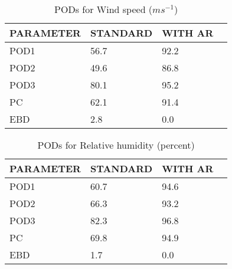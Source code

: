 \documentclass[11pt,english]{article}
\begin{document}
\newpage

\clearpage
\begin{table}[]
\begin{center}
\begin{tabular}{|l|l|l|l|}
\hline
\multicolumn{1}{|c|}{\cellcolor[HTML]{C0C0C0}\textbf{PARAMETER}} & \multicolumn{1}{c|}{\cellcolor[HTML]{C0C0C0}\textbf{STANDARD}} & \multicolumn{1}{c|}{\cellcolor[HTML]{C0C0C0}\textbf{WITH AR}} \\
\hline
\cellcolor[HTML]{C0C0C0}POD1  & 56.7                                & 92.2         \\
\cellcolor[HTML]{C0C0C0}POD2  & 49.6                                & 86.8         \\
\cellcolor[HTML]{C0C0C0}POD3  & 80.1                                & 95.2         \\
\cellcolor[HTML]{C0C0C0}PC    & 62.1                                  & 91.4           \\
\cellcolor[HTML]{C0C0C0}EBD   & 2.8                                 & 0.0          \\
\hline
\end{tabular}
\caption{PODs for Wind speed ($m s^{-1}$)}
\end{center}
\end{table}
\begin{table}[]
\begin{center}
\begin{tabular}{|l|l|l|l|}
\hline
\multicolumn{1}{|c|}{\cellcolor[HTML]{C0C0C0}\textbf{PARAMETER}} & \multicolumn{1}{c|}{\cellcolor[HTML]{C0C0C0}\textbf{STANDARD}} & \multicolumn{1}{c|}{\cellcolor[HTML]{C0C0C0}\textbf{WITH AR}} \\
\hline
\cellcolor[HTML]{C0C0C0}POD1  & 60.7                                & 94.6         \\
\cellcolor[HTML]{C0C0C0}POD2  & 66.3                                & 93.2         \\
\cellcolor[HTML]{C0C0C0}POD3  & 82.3                                & 96.8         \\
\cellcolor[HTML]{C0C0C0}PC    & 69.8                                  & 94.9           \\
\cellcolor[HTML]{C0C0C0}EBD   & 1.7                                 & 0.0          \\
\hline
\end{tabular}
\caption{PODs for Relative humidity (percent)}
\end{center}
\end{table}
\end{document}
